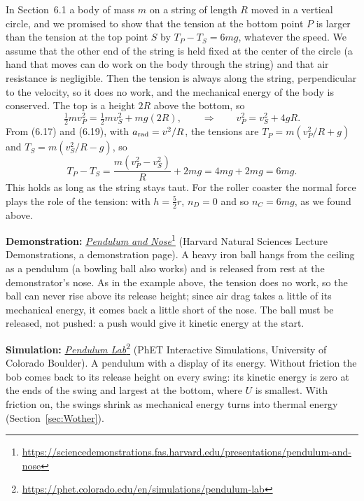\documentclass[11pt,a4paper]{article}
\begin{document}
\begin{example}
\setlength{\parskip}{0.5em plus 0.1em}%
In Section~6.1 a body of mass $m$ on a string of length $R$ moved in a vertical circle, and we
promised to show that the tension at the bottom point $P$ is larger than the tension at the top point
$S$ by $T_P - T_S = 6mg$, whatever the speed. We assume that the other end of the string is held
fixed at the center of the circle (a hand that moves can do work on the body through the string)
and that air resistance is negligible. Then the tension is always along the string, perpendicular to
the velocity, so it does no work, and the mechanical energy of the body is conserved. The top is a
height $2R$ above the bottom, so
\[
  \tfrac12 mv_P^2 = \tfrac12 mv_S^2 + mg(2R) , \qquad\Rightarrow\qquad v_P^2 = v_S^2 + 4gR .
\]
From \textup{(6.17)} and \textup{(6.19)}, with $a_{\mathrm{rad}} = v^2/R$, the tensions are
$T_P = m(v_P^2/R + g)$ and $T_S = m(v_S^2/R - g)$, so
\[
  T_P - T_S = \frac{m(v_P^2 - v_S^2)}{R} + 2mg = 4mg + 2mg = 6mg .
\]
This holds as long as the string stays taut. For the roller coaster the normal force plays the role
of the tension: with $h = \frac52 r$, $n_D = 0$ and so $n_C = 6mg$, as we found above.
\end{example}

\begin{aside}
\textbf{Demonstration:}
\href{https://sciencedemonstrations.fas.harvard.edu/presentations/pendulum-and-nose}{\emph{Pendulum
and
Nose}}\footnote{\url{https://sciencedemonstrations.fas.harvard.edu/presentations/pendulum-and-nose}}
(Harvard Natural Sciences Lecture Demonstrations, a demonstration page). A heavy iron ball hangs
from the ceiling as a pendulum (a bowling ball also works) and is released from rest at the
demonstrator's nose. As in the example above, the tension does no work, so the ball can never rise
above its release height; since air drag takes a little of its mechanical energy, it comes back a
little short of the nose. The ball must be released, not pushed: a push would give it kinetic
energy at the start.
\par\smallskip
\textbf{Simulation:}
\href{https://phet.colorado.edu/en/simulations/pendulum-lab}{\emph{Pendulum
Lab}}\footnote{\url{https://phet.colorado.edu/en/simulations/pendulum-lab}} (PhET Interactive
Simulations, University of Colorado Boulder). A pendulum with a display of its energy. Without
friction the bob comes back to its release height on every swing: its kinetic energy is zero at
the ends of the swing and largest at the bottom, where $U$ is smallest. With friction on, the
swings shrink as mechanical energy turns into thermal energy (Section~\ref{sec:Wother}).
\end{aside}
\end{document}
